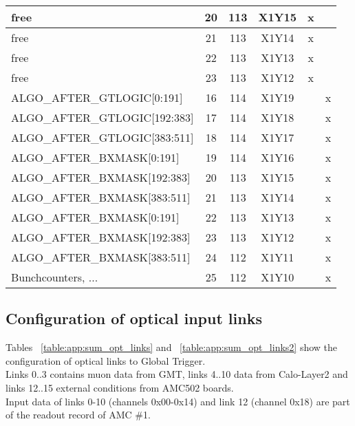\begin{longtable}{|l|c|c|c|c|c|}
free & 20  & 113 & X1Y15 & x &   \\\hline
free & 21  & 113 & X1Y14 & x &   \\\hline
free & 22  & 113 & X1Y13 & x &   \\\hline
free & 23  & 113 & X1Y12 & x &   \\\hline\hline
ALGO\_AFTER\_GTLOGIC[0:191] & 16  & 114 & X1Y19 &   & x \\\hline
ALGO\_AFTER\_GTLOGIC[192:383] & 17  & 114 & X1Y18 &   & x \\\hline
ALGO\_AFTER\_GTLOGIC[383:511] & 18  & 114 & X1Y17 &   & x \\\hline
ALGO\_AFTER\_BXMASK[0:191] & 19  & 114 & X1Y16 &   & x \\\hline
ALGO\_AFTER\_BXMASK[192:383] & 20  & 113 & X1Y15 &   & x \\\hline
ALGO\_AFTER\_BXMASK[383:511] & 21  & 113 & X1Y14 &   & x \\\hline
ALGO\_AFTER\_BXMASK[0:191] & 22  & 113 & X1Y13 &   & x \\\hline
ALGO\_AFTER\_BXMASK[192:383] & 23  & 113 & X1Y12 &   & x \\\hline
ALGO\_AFTER\_BXMASK[383:511] & 24  & 112 & X1Y11 &   & x \\\hline
Bunchcounters, ... & 25  & 112 & X1Y10 &   & x \\\hline
\end{longtable}

\clearpage

\subsection{Configuration of optical input links}\label{sec:app:app_b}

% 
% 

Tables ~\ref{table:app:sum_opt_links} and ~\ref{table:app:sum_opt_links2} show the configuration of optical links to Global Trigger.\\
Links 0..3 contains muon data from GMT, links 4..10 data from Calo-Layer2 and links 12..15 external conditions from AMC502 boards.\\
Input data of links 0-10 (channels 0x00-0x14) and link 12 (channel 0x18) are part of the readout record of AMC \#1.

